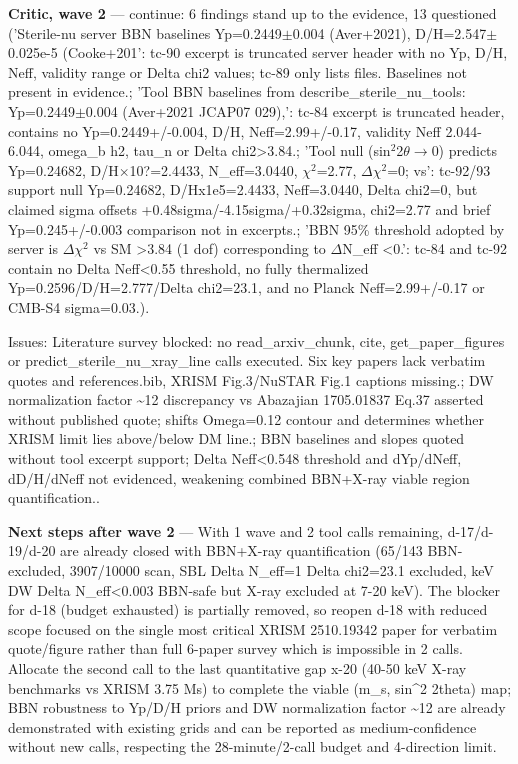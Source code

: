 \documentclass[11pt,a4paper]{article}
\begin{document}
\textbf{Critic, wave 2} --- continue: 6 findings stand up to the evidence, 13 questioned ('Sterile-nu server BBN baselines Yp=0.2449$\pm$0.004 (Aver+2021), D/H=2.547$\pm$0.025e-5 (Cooke+201': tc-90 excerpt is truncated server header with no Yp, D/H, Neff, validity range or Delta chi2 values; tc-89 only lists files. Baselines not present in evidence.; 'Tool BBN baselines from describe\_sterile\_nu\_tools: Yp=0.2449$\pm$0.004 (Aver+2021 JCAP07 029),': tc-84 excerpt is truncated header, contains no Yp=0.2449+/-0.004, D/H, Neff=2.99+/-0.17, validity Neff 2.044-6.044, omega\_b h2, tau\_n or Delta chi2\textgreater{}3.84.; 'Tool null (sin$^2$2$\theta$$\to$0) predicts Yp=0.24682, D/H$\times$10?=2.4433, N\_eff=3.0440, $\chi$$^2$=2.77, $\Delta$$\chi$$^2$=0; vs': tc-92/93 support null Yp=0.24682, D/Hx1e5=2.4433, Neff=3.0440, Delta chi2=0, but claimed sigma offsets +0.48sigma/-4.15sigma/+0.32sigma, chi2=2.77 and brief Yp=0.245+/-0.003 comparison not in excerpts.; 'BBN 95\% threshold adopted by server is $\Delta$$\chi$$^2$ vs SM \textgreater{}3.84 (1 dof) corresponding to $\Delta$N\_eff \textless{}0.': tc-84 and tc-92 contain no Delta Neff\textless{}0.55 threshold, no fully thermalized Yp=0.2596/D/H=2.777/Delta chi2=23.1, and no Planck Neff=2.99+/-0.17 or CMB-S4 sigma=0.03.).

Issues: Literature survey blocked: no read\_arxiv\_chunk, cite, get\_paper\_figures or predict\_sterile\_nu\_xray\_line calls executed. Six key papers lack verbatim quotes and references.bib, XRISM Fig.3/NuSTAR Fig.1 captions missing.; DW normalization factor \textasciitilde{}12 discrepancy vs Abazajian 1705.01837 Eq.37 asserted without published quote; shifts Omega=0.12 contour and determines whether XRISM limit lies above/below DM line.; BBN baselines and slopes quoted without tool excerpt support; Delta Neff\textless{}0.548 threshold and dYp/dNeff, dD/H/dNeff not evidenced, weakening combined BBN+X-ray viable region quantification..

\textbf{Next steps after wave 2} --- With 1 wave and 2 tool calls remaining, d-17/d-19/d-20 are already closed with BBN+X-ray quantification (65/143 BBN-excluded, 3907/10000 scan, SBL Delta N\_eff=1 Delta chi2=23.1 excluded, keV DW Delta N\_eff\textless{}0.003 BBN-safe but X-ray excluded at 7-20 keV). The blocker for d-18 (budget exhausted) is partially removed, so reopen d-18 with reduced scope focused on the single most critical XRISM 2510.19342 paper for verbatim quote/figure rather than full 6-paper survey which is impossible in 2 calls. Allocate the second call to the last quantitative gap x-20 (40-50 keV X-ray benchmarks vs XRISM 3.75 Ms) to complete the viable (m\_s, sin\textasciicircum{}2 2theta) map; BBN robustness to Yp/D/H priors and DW normalization factor \textasciitilde{}12 are already demonstrated with existing grids and can be reported as medium-confidence without new calls, respecting the 28-minute/2-call budget and 4-direction limit.
\end{document}
